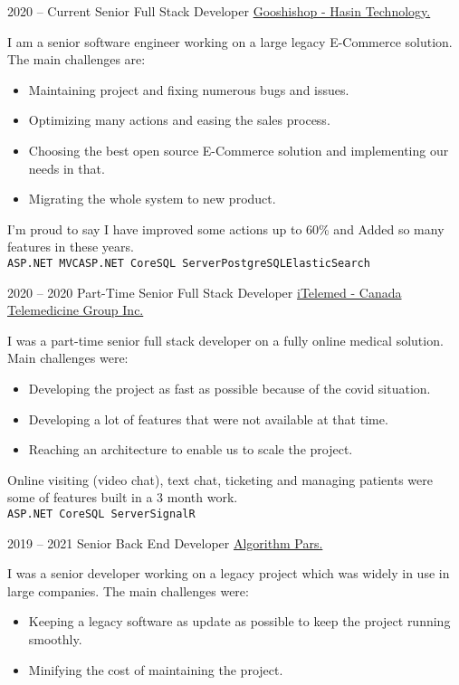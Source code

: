 \documentclass[a4paper]{developercv} %
\begin{document}
\begin{entrylist}
	\entry
	{2020 -- Current}
	{Senior Full Stack Developer}
	{\href{https://gooshishop.com}{Gooshishop - Hasin Technology.}}
	{I am a senior software engineer working on a large legacy E-Commerce solution. The main challenges are:
	\begin{itemize}[noitemsep]
		\item Maintaining project and fixing numerous bugs and issues.
		\item Optimizing many actions and easing the sales process.
		\item Choosing the best open source E-Commerce solution and implementing our needs in that.
		\item Migrating the whole system to new product.
	\end{itemize}
	I'm proud to say I have improved some actions up to 60\% and Added so many features in these years.
		\\\texttt{ASP.NET MVC}\slashsep\texttt{ASP.NET Core}\slashsep\texttt{SQL Server}\slashsep\texttt{PostgreSQL}\slashsep\texttt{ElasticSearch}}
	\entry
	{2020 -- 2020}
	{Part-Time Senior Full Stack Developer}
	{\href{https://itelemed.ca}{iTelemed - Canada Telemedicine Group Inc.}}
	{I was a part-time senior full stack developer on a fully online medical solution. Main challenges were:
	\begin{itemize}[noitemsep]
		\item Developing the project as fast as possible because of the covid situation.
		\item Developing a lot of features that were not available at that time.
		\item Reaching an architecture to enable us to scale the project.
	\end{itemize}
	Online visiting (video chat), text chat, ticketing and managing patients were some of features built in a 3 month work.
		\\\texttt{ASP.NET Core}\slashsep\texttt{SQL Server}\slashsep\texttt{SignalR}}
	\entry
	{2019 -- 2021}
	{Senior Back End Developer}
	{\href{https://apdp.ir}{Algorithm Pars.}}
	{I was a senior developer working on a legacy project which was widely in use in large companies. The main challenges were:
	\begin{itemize}[noitemsep]
		\item Keeping a legacy software as update as possible to keep the project running smoothly.
		\item Minifying the cost of maintaining the project.

\end{itemize}}
\end{entrylist}
\end{document}
